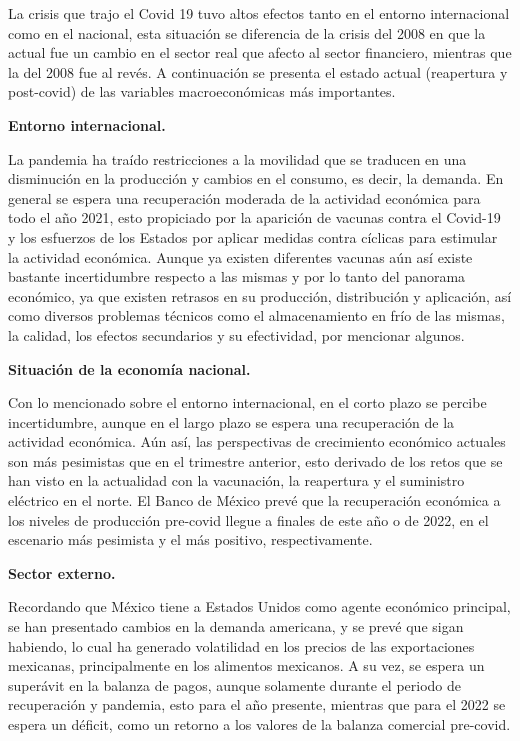 La crisis que trajo el Covid 19 tuvo altos efectos tanto en el entorno internacional como en el nacional, esta situación se diferencia de la crisis del 2008 en que la actual fue un cambio en el sector real que afecto al sector financiero, mientras que la del 2008 fue al revés. A continuación se presenta el estado actual (reapertura y post-covid) de las variables macroeconómicas más importantes.

\textbf{Entorno internacional.}

La pandemia ha traído restricciones a la movilidad que se traducen en una disminución en la producción y cambios en el consumo, es decir, la demanda.
En general se espera una recuperación moderada de la actividad económica para todo el año 2021, esto propiciado por la aparición de vacunas contra el Covid-19 y los esfuerzos de los Estados por aplicar medidas contra cíclicas para estimular la actividad económica.
Aunque ya existen diferentes vacunas aún así existe bastante incertidumbre respecto a las mismas y por lo tanto del panorama económico, ya que existen retrasos en su producción, distribución y aplicación, así como diversos problemas técnicos como el almacenamiento en frío de las mismas, la calidad, los efectos secundarios y su efectividad, por mencionar algunos.

\textbf{Situación de la economía nacional.}

Con lo mencionado sobre el entorno internacional, en el corto plazo se percibe incertidumbre, aunque en el largo plazo se espera una recuperación de la actividad económica.
Aún así, las perspectivas de crecimiento económico actuales son más pesimistas que en el trimestre anterior, esto derivado de los retos que se han visto en la actualidad con la vacunación, la reapertura y el suministro eléctrico en el norte.
El Banco de México prevé que la recuperación económica a los niveles de producción pre-covid llegue a finales de este año o de 2022, en el escenario más pesimista y el más positivo, respectivamente.


\textbf{Sector externo.}

Recordando que México tiene a Estados Unidos como agente económico principal, se han presentado cambios en la demanda americana, y se prevé que sigan habiendo, lo cual ha generado volatilidad en los precios de las exportaciones mexicanas, principalmente en los alimentos mexicanos.
A su vez, se espera un superávit en la balanza de pagos, aunque solamente durante el periodo de recuperación y pandemia, esto para el año presente, mientras que para el 2022 se espera un déficit, como un retorno a los valores de la balanza comercial pre-covid.

